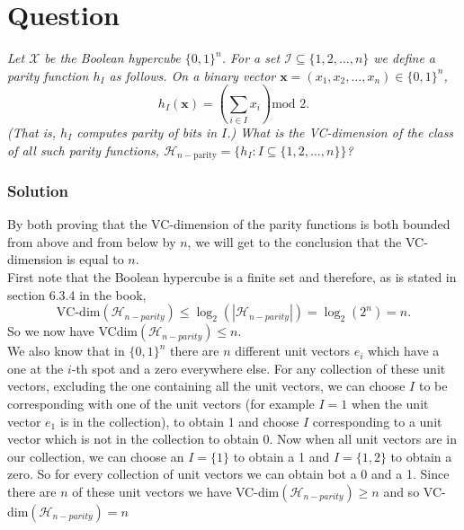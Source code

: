 \documentclass{article}
\newcounter{counterquestion}
\newenvironment{question}[1]
{
\stepcounter{counterquestion}
\section*{Question \thecounterquestion}
\textit{#1} 
} 
{
}
\newenvironment{solution}
{
\subsubsection*{Solution}
} 
{
}
\begin{document}
\begin{question}{Let $\mathcal{X}$ be the Boolean hypercube $\{0 , 1 \} ^n$. For a set $\mathcal{I} \subseteq \{ 1,2,\dots , n \}$ we define a \textit{parity function} $h_I$ as follows. On a binary vector $\textbf{x}=(x_1, x_2, \dots , x_n )\in \{ 0,1\} ^n$,
$$h_I (\textbf{x}) = (\sum _{i\in I} x_i) \text{mod 2}.$$
(That is, $h_I$ computes parity of bits in $I$.) What is the VC-dimension of the class of all such parity functions, $\mathcal{H} _{n-\text{parity}}=\{ h_I : I\subseteq \{ 1,2,\dots , n\} \}$?}
\begin{solution}
By both proving that the VC-dimension of the parity functions is both bounded from above and from below by $n$, we will get to the conclusion that the VC-dimension is equal to $n$.\\
First note that the Boolean hypercube is a finite set and therefore, as is stated in section 6.3.4 in the book, $$\text{VC-dim}(\mathcal{H}_{n-parity})\leq \log _2 (| \mathcal{H}_{n-parity}|)= \log _2 (2^n)=n.$$
So we now have VCdim$(\mathcal{H}_{n-parity}) \leq n$.\\
We also know that in $\{ 0,1 \}^n$ there are $n$ different unit vectors $e_i$ which have a one at the $i$-th spot and a zero everywhere else. For any collection of these unit vectors, excluding the one containing all the unit vectors, we can choose $I$ to be corresponding with one of the unit vectors (for example $I=1$ when the unit vector $e_1$ is in the collection), to obtain 1 and choose $I$ corresponding to a unit vector which is not in the collection to obtain 0. Now when all unit vectors are in our collection, we can choose an $I=\{1 \} $ to obtain a 1 and $I=\{ 1,2 \} $ to obtain a zero. So for every collection of unit vectors we can obtain bot a 0 and a 1. Since there are $n$ of these unit vectors we have VC-dim$(\mathcal{H} _{n-parity}) \geq n$ and so VC-dim$(\mathcal{H} _{n-parity}) = n$
\end{solution}
\end{question}
\end{document}
